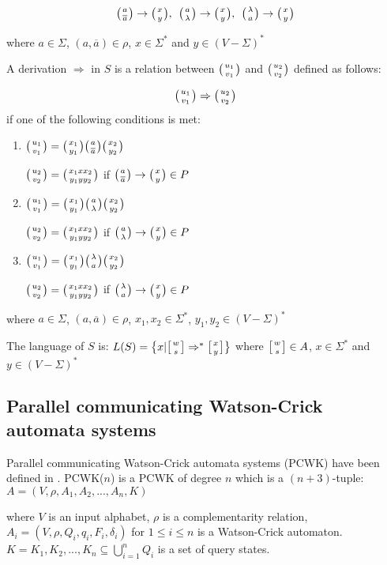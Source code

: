 $$\wkpair{a}{\overline{a}} \rightarrow \wkpair{x}{y}, \:\: \wkpair{a}{\lambda} \rightarrow \wkpair{x}{y},\:\: \wkpair{\lambda}{a} \rightarrow \wkpair{x}{y}$$

where $a \in \Sigma$, $(a, \overline{a}) \in \rho$, $x \in \Sigma^*$ and $y \in (V - \Sigma)^*$

A derivation $\Rightarrow$ in $S$ is a relation between $\wkpair{u_1}{v_1}$ and $\wkpair{u_2}{v_2}$ defined as follows:

$$\wkpair{u_1}{v_1} \Rightarrow \wkpair{u_2}{v_2}$$ if one of the following conditions is met:

\begin{enumerate}
  \item{$\wkpair{u_1}{v_1} = \wkpair{x_1}{y_1} \wkpair{a}{\overline{a}} \wkpair{x_2}{y_2}$

  $\wkpair{u_2}{v_2} = \wkpair{x_1xx_2}{y_1yy_2}$ if $\wkpair{a}{\overline{a}} \rightarrow \wkpair{x}{y} \in P$
  }

  \item{$\wkpair{u_1}{v_1} = \wkpair{x_1}{y_1} \wkpair{a}{\lambda} \wkpair{x_2}{y_2}$

  $\wkpair{u_2}{v_2} = \wkpair{x_1xx_2}{y_1yy_2}$ if $\wkpair{a}{\lambda} \rightarrow \wkpair{x}{y} \in P$
  }

  \item{$\wkpair{u_1}{v_1} = \wkpair{x_1}{y_1} \wkpair{\lambda}{a} \wkpair{x_2}{y_2}$

  $\wkpair{u_2}{v_2} = \wkpair{x_1xx_2}{y_1yy_2}$ if $\wkpair{\lambda}{a} \rightarrow \wkpair{x}{y} \in P$
  }

\end{enumerate}

where $a \in \Sigma$, $(a, \overline{a}) \in \rho$, $x_1, x_2 \in \Sigma^*$, $y_1, y_2 \in (V - \Sigma)^*$

The language of $S$ is: $L(S) = \big\{x| \wkdomain{w}{s} \Rightarrow^* \wkdomain{x}{y} \big\}$ where $\wkdomain{w}{s} \in A$, $x \in \Sigma^*$ and $y \in (V - \Sigma)^*$

\subsection{Parallel communicating Watson-Crick automata systems}
Parallel communicating Watson-Crick automata systems (PCWK) have been defined in \cite{PARALLEL}. PCWK($n$) is a PCWK of degree $n$ which is a $(n + 3)$-tuple: $A = (V, \rho, A_1, A_2, ..., A_n, K)$

where $V$ is an input alphabet, $\rho$ is a complementarity relation, $A_i = (V, \rho, Q_i, q_i, F_i, \delta_i)$ for $1 \leq i \leq n$ is a Watson-Crick automaton. $K = {K_1, K_2, ..., K_n} \subseteq \bigcup_{i=1}^{n} Q_i$ is a set of query states.

